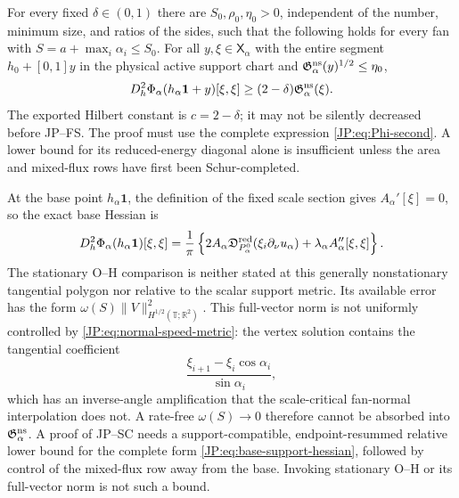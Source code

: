 \begin{remark}
\label{JP:rem:SC}
For every fixed $\delta\in(0,1)$ there are
$S_0,\rho_0,\eta_0>0$, independent of the number, minimum size, and ratios
of the sides, such that the following holds for every fan with
$S=a+\max_i\alpha_i\le S_0$.  For all
$y,\xi\in\mathsf X_\alpha$ with the
entire segment $h_0+[0,1]y$ in the physical active support chart and
$\mathfrak G_\alpha^{\rm ns}(y)^{1/2}\le\eta_0$,
\begin{equation}\label{JP:eq:SC}
 D_h^2\Phi_\alpha(h_\alpha\mathbf1+y)[\xi,\xi]
 \ge (2-\delta)\mathfrak G_\alpha^{\rm ns}(\xi).
\end{equation}
The exported Hilbert constant is $c=2-\delta$; it may not be silently
decreased before JP--FS.
The proof must use the complete expression \eqref{JP:eq:Phi-second}.  A lower
bound for its reduced-energy diagonal alone is insufficient unless the
area and mixed-flux rows have first been Schur-completed.
\end{remark}

\begin{remark}
At the base point $h_\alpha\mathbf1$, the definition of the fixed scale
section gives $A_\alpha'[\xi]=0$, so the exact base Hessian is
\begin{equation}\label{JP:eq:base-support-hessian}
 D_h^2\Phi_\alpha(h_\alpha\mathbf1)[\xi,\xi]
 =\frac1\pi\left\{
 2A_\alpha\mathfrak D^{\rm red}_{P_\alpha^0}(\xi_i\partial_\nu u_\alpha)
 +\lambda_\alpha A_\alpha''[\xi,\xi]\right\}.
\end{equation}
The stationary O--H comparison is neither stated at this generally
nonstationary tangential polygon nor relative to the scalar support metric.
Its available error has the form
$\omega(S)\|V\|_{H^{1/2}(\mathbb T;\mathbb R^2)}^2$.  This full-vector
norm is not uniformly controlled by \eqref{JP:eq:normal-speed-metric}: the
vertex solution contains the tangential coefficient
\[
 \frac{\xi_{i+1}-\xi_i\cos\alpha_i}{\sin\alpha_i},
\]
which has an inverse-angle amplification that the scale-critical
fan-normal interpolation does not.  A rate-free $\omega(S)\to0$ therefore
cannot be absorbed into $\mathfrak G_\alpha^{\rm ns}$.  A proof of JP--SC
needs a support-compatible,
endpoint-resummed relative lower bound for the complete form
\eqref{JP:eq:base-support-hessian}, followed by control of the mixed-flux row
away from the base.  Invoking stationary O--H or its full-vector norm is
not such a bound.
\end{remark}


